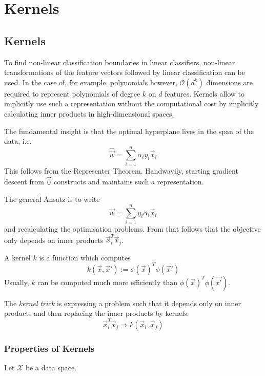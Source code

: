 \chapter{Kernels}

\section{Kernels}
To find non-linear classification boundaries in linear
classifiers, non-linear transformations of the feature vectors
followed by linear classification can be used.
In the case of, for example, polynomials however,
$\mathcal{O}(d^k)$ dimensions are required to represent
polynomials of degree $k$ on $d$ features.
Kernels allow to implicitly use such a representation
without the computational cost by implicitly calculating
inner products in high-dimensional spaces.

The fundamental insight is that the optimal hyperplane
lives in the span of the data, i.e.
\begin{equation*}
\hat{\vec{w}} = \sum_{i=1}^n{\alpha_i y_i \vec{x}_i}
\end{equation*}
This follows from the Representer Theorem.
Handwavily, starting gradient descent from $\vec{0}$
constructs and maintains such a representation.

The general Ansatz is to write
\begin{equation*}
\vec{w} = \sum_{i=1}^n{y_i \alpha_i \vec{x}_i}
\end{equation*}
and recalculating the optimisation problems.
From that follows that the objective only depends
on inner products $\vec{x}_i^T \vec{x}_j$.

A kernel $k$ is a function which computes
\begin{equation*}
k(\vec{x}, \vec{x}') :=
\phi(\vec{x})^T \phi(\vec{x}')
\end{equation*}
Usually, $k$ can be computed much more efficiently than
$\phi(\vec{x})^T \phi(\vec{x'})$.

The \emph{kernel trick} is expressing a problem such that
it depends only on inner products and then replacing the
inner products by kernels:
\begin{equation*}
\vec{x}_i^T \vec{x}_j \Rightarrow k(\vec{x}_i, \vec{x}_j)
\end{equation*}


\subsection{Properties of Kernels}
Let $\mathcal{X}$ be a data space.

